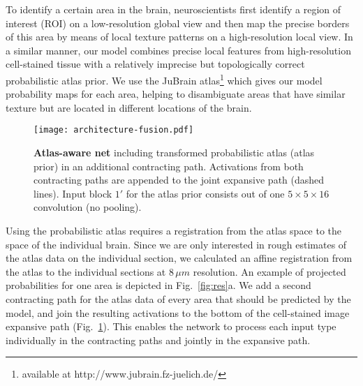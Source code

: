 \documentclass{article}
\begin{document}
To identify a certain area in the brain, neuroscientists first identify a region of interest (ROI) on a low-resolution global view and then map the precise borders of this area by means of local texture patterns on a high-resolution local view.
In a similar manner, our model combines precise local features from high-resolution cell-stained tissue with a relatively imprecise but topologically correct probabilistic atlas prior. 
We use the JuBrain atlas\footnote{available at http://www.jubrain.fz-juelich.de/} which gives our model probability maps for each area, helping to disambiguate areas that have similar texture but are located in different locations of the brain. 

\begin{figure}
	\texttt{[image: architecture-fusion.pdf]}
	\caption{
		\textbf{Atlas-aware net} including transformed probabilistic atlas (atlas prior) in an additional contracting path.
		Activations from both contracting paths are appended to the joint expansive path (dashed lines).
		Input block $1'$ for the atlas prior consists out of one $5\times5\times16$ convolution (no pooling).
	}
	\label{fig:arch-fusion}
\end{figure}


Using the probabilistic atlas requires a registration from the atlas space to the space of the individual brain. 
Since we are only interested in rough estimates of the atlas data on the individual section, we calculated an affine registration from the atlas to the individual sections at $8\,\mu m$ resolution.
An example of projected probabilities for one area is depicted in Fig.~\ref{fig:res}a.
%
We add a second contracting path for the atlas data of every area that should be predicted by the model, and join the resulting activations to the bottom of the cell-stained image expansive path (Fig.~\ref{fig:arch-fusion}). 
This enables the network to process each input type individually in the contracting paths and jointly in the expansive path. 
\end{document}
